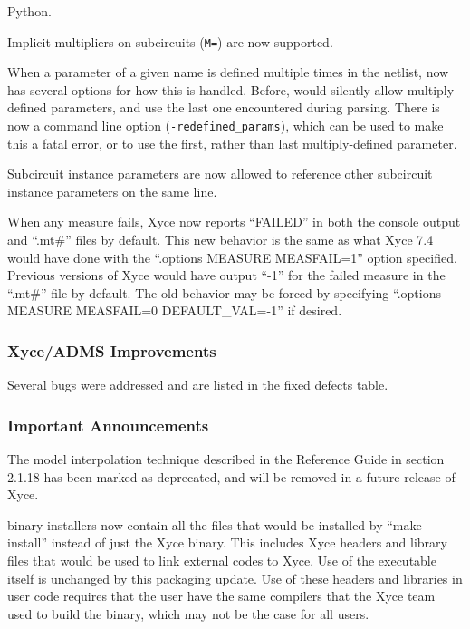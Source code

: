 \documentclass[letterpaper]{scrartcl}
\begin{document}
\begin{XyceItemize}
    Python.
  \item Implicit multipliers on subcircuits (\texttt{M=}) are now supported.
  \item When a parameter of a given name is defined multiple times in
    the netlist, \Xyce{} now has several options for how this is
    handled.  Before, \Xyce{} would silently allow multiply-defined
    parameters, and use the last one encountered during parsing.  There
    is now a command line option (\texttt{-redefined\_params}), which
    can be used to make this a fatal error, or to use the first, rather
    than last multiply-defined parameter.
  \item Subcircuit instance parameters are now allowed to reference 
    other subcircuit instance parameters on the same line.
  \item When any measure fails, Xyce now reports ``FAILED'' in both the
    console output and ``.mt\#'' files by default.  This new behavior is
    the same as what Xyce 7.4 would have done with the ``.options
    MEASURE MEASFAIL=1'' option specified.  Previous versions of Xyce
    would have output ``-1'' for the failed measure in the ``.mt\#''
    file by default.  The old behavior may be forced by specifying
    ``.options MEASURE MEASFAIL=0 DEFAULT\_VAL=-1'' if desired.
\end{XyceItemize}

\subsubsection*{Xyce/ADMS Improvements}
\begin{XyceItemize}
  \item Several bugs were addressed and are listed in the fixed defects table.
\end{XyceItemize}

\subsubsection*{Important Announcements}
\begin{XyceItemize}
\item The model interpolation technique described in the \Xyce{}
  Reference Guide in section 2.1.18 has been marked as deprecated, and
  will be removed in a future release of Xyce.
\item \Xyce{} binary installers now contain all the files that would
  be installed by ``make install'' instead of just the Xyce binary.
  This includes Xyce headers and library files that would be used to
  link external codes to Xyce.  Use of the \Xyce{} executable itself
  is unchanged by this packaging update.  Use of these headers and
  libraries in user code requires that the user have the same
  compilers that the Xyce team used to build the binary, which may not
  be the case for all users.
\end{XyceItemize}
\end{document}
